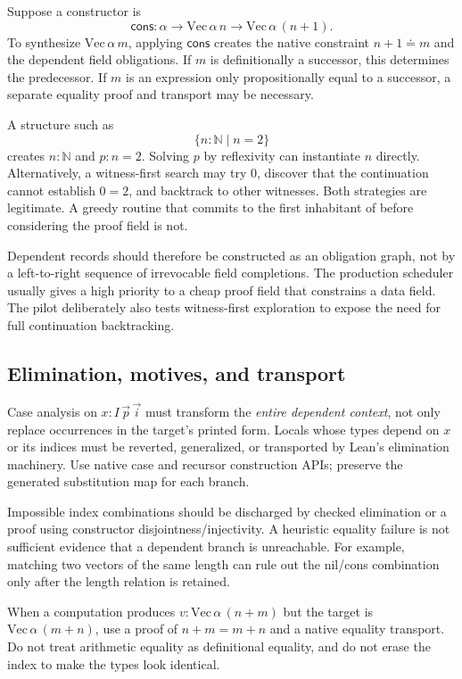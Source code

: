 \documentclass[11pt,a4paper]{article}
\newcommand{\code}[1]{\texttt{\detokenize{#1}}}
\newcommand{\N}{\mathbb N}
\theoremstyle{remark}
\begin{document}
Suppose a constructor is
\[
 \mathsf{cons}:\alpha\to\mathrm{Vec}\,\alpha\,n\to
                      \mathrm{Vec}\,\alpha\,(n+1).
\]
To synthesize $\mathrm{Vec}\,\alpha\,m$, applying $\mathsf{cons}$ creates the native constraint $n+1\doteq m$ and the dependent field obligations. If $m$ is definitionally a successor, this determines the predecessor. If $m$ is an expression only propositionally equal to a successor, a separate equality proof and transport may be necessary.

A structure such as
\[
 \{n:\N\mid n=2\}
\]
creates $n:\N$ and $p:n=2$. Solving $p$ by reflexivity can instantiate $n$ directly. Alternatively, a witness-first search may try $0$, discover that the continuation cannot establish $0=2$, and backtrack to other witnesses. Both strategies are legitimate. A greedy routine that commits to the first inhabitant of \code{Nat} before considering the proof field is not.

Dependent records should therefore be constructed as an obligation graph, not by a left-to-right sequence of irrevocable field completions. The production scheduler usually gives a high priority to a cheap proof field that constrains a data field. The pilot deliberately also tests witness-first exploration to expose the need for full continuation backtracking.

\subsection{Elimination, motives, and transport}

Case analysis on $x:I\,\vec p\,\vec i$ must transform the \emph{entire dependent context}, not only replace occurrences in the target's printed form. Locals whose types depend on $x$ or its indices must be reverted, generalized, or transported by Lean's elimination machinery. Use native case and recursor construction APIs; preserve the generated substitution map for each branch.

Impossible index combinations should be discharged by checked elimination or a proof using constructor disjointness/injectivity. A heuristic equality failure is not sufficient evidence that a dependent branch is unreachable. For example, matching two vectors of the same length can rule out the nil/cons combination only after the length relation is retained.

When a computation produces $v:\mathrm{Vec}\,\alpha\,(n+m)$ but the target is $\mathrm{Vec}\,\alpha\,(m+n)$, use a proof of $n+m=m+n$ and a native equality transport. Do not treat arithmetic equality as definitional equality, and do not erase the index to make the types look identical.
\end{document}
